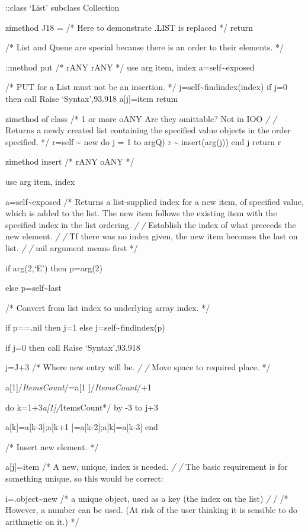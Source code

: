 ::class `List' subclass Collection

zimethod J18 = /* Here to demonstrate .LIST is replaced */ return

/* List and Queue are special because there is an order to their
elements. */

::method put /* rANY rANY */ use arg item, index
a=self\textasciitilde exposed

/* PUT for a List must not be an insertion. */
j=self\textasciitilde findindex(index) if j=0 then call Raise
`Syntax',93.918 a{[}j{]}=item retum

zimethod of class /* 1 or more oANY Are they omittable? Not in IOO
\emph{/ /} Returns a newly created list containing the specified value
objects in the order specified. */ r=self \textasciitilde{} new do j = 1
to argQ) r \textasciitilde{} insert(arg(j)) end j return r

zimethod insert /* rANY oANY */

use arg item, index

a=self\textasciitilde exposed /* Returns a list-supplied index for a new
item, of specified value, which is added to the list. The new item
follows the existing item with the specified index in the list ordering.
\emph{/ /} Establish the index of what preceeds the new element. \emph{/
/} Tf there was no index given, the new item becomes the last on list.
\emph{/ /} mil argument means first */

if arg(2,`E') then p=arg(2)

else p=self\textasciitilde last

/* Convert from list index to underlying array index. */

if p==.nil then j=1 else j=self\textasciitilde findindex(p)

if j=0 then call Raise `Syntax',93.918

j=J+3 /* Where new entry will be. \emph{/ /} Move space to required
place. */

a{[}1{]}/\emph{ItemsCount}/=a{[}1 {]}/\emph{ItemsCount}/+1

do k=1+3\emph{a{[}1{]}/}ItemsCount*/ by -3 to j+3

a{[}k{]}=a{[}k-3{]};a{[}k+1 {]}=a{[}k-2{]};a{[}k{]}=a{[}k-3{]} end

/* Insert new element. */

a{[}j{]}=item /* A new, unique, index is needed. \emph{/ /} The basic
requirement is for something unique, so this would be correct:

i=.object\textasciitilde new /* a unique object, used as a key (the
index on the list) \emph{/ }/ /* However, a number can be used. (At risk
of the user thinking it is sensible to do arithmetic on it.) */


